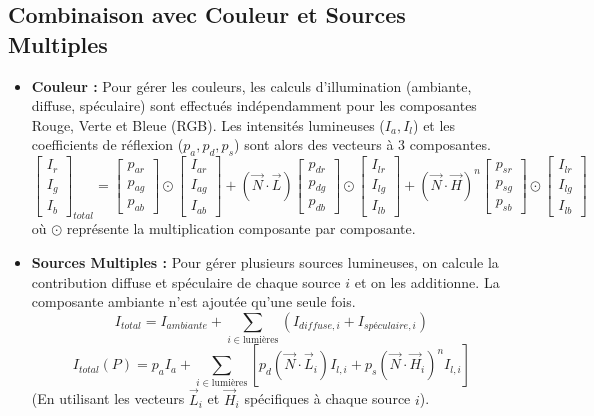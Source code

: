 \subsection{Combinaison avec Couleur et Sources Multiples}
\begin{itemize}
    \item \textbf{Couleur :} Pour gérer les couleurs, les calculs d'illumination (ambiante, diffuse, spéculaire) sont effectués indépendamment pour les composantes Rouge, Verte et Bleue (RGB). Les intensités lumineuses (\(I_a, I_l\)) et les coefficients de réflexion (\(p_a, p_d, p_s\)) sont alors des vecteurs à 3 composantes.
    \[
    \begin{bmatrix} I_r \\ I_g \\ I_b \end{bmatrix}_{total} =
    \begin{bmatrix} p_{ar} \\ p_{ag} \\ p_{ab} \end{bmatrix} \odot \begin{bmatrix} I_{ar} \\ I_{ag} \\ I_{ab} \end{bmatrix} +
    (\vec{N} \cdot \vec{L}) \begin{bmatrix} p_{dr} \\ p_{dg} \\ p_{db} \end{bmatrix} \odot \begin{bmatrix} I_{lr} \\ I_{lg} \\ I_{lb} \end{bmatrix} +
    (\vec{N} \cdot \vec{H})^n \begin{bmatrix} p_{sr} \\ p_{sg} \\ p_{sb} \end{bmatrix} \odot \begin{bmatrix} I_{lr} \\ I_{lg} \\ I_{lb} \end{bmatrix}
    \]
    où \(\odot\) représente la multiplication composante par composante.
    \item \textbf{Sources Multiples :} Pour gérer plusieurs sources lumineuses, on calcule la contribution diffuse et spéculaire de chaque source \(i\) et on les additionne. La composante ambiante n'est ajoutée qu'une seule fois.
    \[ I_{total} = I_{ambiante} + \sum_{i \in \text{lumières}} (I_{diffuse, i} + I_{spéculaire, i}) \]
    \[
    I_{total}(P) = p_a I_a + \sum_{i \in \text{lumières}} \left[ p_d (\vec{N} \cdot \vec{L}_i) I_{l,i} + p_s (\vec{N} \cdot \vec{H}_i)^n I_{l,i} \right]
    \]
    (En utilisant les vecteurs \(\vec{L}_i\) et \(\vec{H}_i\) spécifiques à chaque source \(i\)).
\end{itemize}
